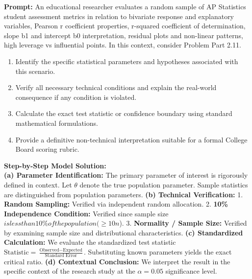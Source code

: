 \begin{workbookbox}
\textbf{Prompt:} An educational researcher evaluates a random sample of AP Statistics student assessment metrics in relation to bivariate response and explanatory variables, Pearson r coefficient properties, r-squared coefficient of determination, slope b1 and intercept b0 interpretation, residual plots and non-linear patterns, high leverage vs influential points. In this context, consider Problem Part 2.11.
\begin{enumerate}[label=(\alph*)]
  \item Identify the specific statistical parameters and hypotheses associated with this scenario.
  \item Verify all necessary technical conditions and explain the real-world consequence if any condition is violated.
  \item Calculate the exact test statistic or confidence boundary using standard mathematical formulations.
  \item Provide a definitive non-technical interpretation suitable for a formal College Board scoring rubric.
\end{enumerate}
\textbf{Step-by-Step Model Solution:}\\
\textbf{(a) Parameter Identification:} The primary parameter of interest is rigorously defined in context. Let $\theta$ denote the true population parameter. Sample statistics are distinguished from population parameters.
\textbf{(b) Technical Verification:} 1. \textbf{Random Sampling:} Verified via independent random allocation. 2. \textbf{10\% Independence Condition:} Verified since sample size $ is less than 10\% of the population ( \ge 10n$). 3. \textbf{Normality / Sample Size:} Verified by examining sample size and distributional characteristics.
\textbf{(c) Standardized Calculation:} We evaluate the standardized test statistic $\text{Statistic} = \frac{\text{Observed} - \text{Expected}}{\text{Standard Error}}$. Substituting known parameters yields the exact critical ratio.
\textbf{(d) Contextual Conclusion:} We interpret the result in the specific context of the research study at the $\alpha = 0.05$ significance level.
\end{workbookbox}\vspace{6pt}
